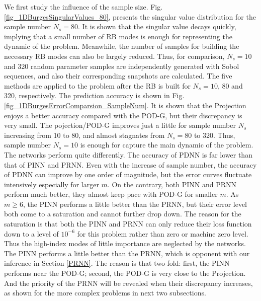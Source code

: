 \documentclass[preprint, 10pt]{elsarticle}
\begin{document}
We first study the influence of the sample size. Fig. \ref{fig_1DBurgesSingularValues_80}, presents the singular value distribution for the sample number $N_s=80$. It is shown that the singular value decays quickly, implying that  a small number of RB modes is enough for representing the dynamic of the problem. Meanwhile, the number of samples for building the necessary RB modes can also be largely reduced. Thus, for comparison, $N_{s}=10$ and 320 random parameter samples are independently generated with Sobol sequences, and also their corresponding snapshots are calculated. The five methods are applied to the problem after the RB is built for $N_{s}=10$, 80 and 320, respectively. The prediction accuracy is shown in Fig. \ref{fig_1DBurgesErrorComparsion_SampleNum}. It is shown that the Projection enjoys a better accuracy compared with the POD-G, but their discrepancy is very small. The pojection/POD-G improves just a little for sample number $N_s$ increasing from 10 to 80, and almost stagnates from $N_s=80$ to 320. Thus, sample number $N_s=10$ is enough for capture the main dynamic of the problem. The networks perform quite differently. The accuracy of PDNN is far lower than that of PINN and PRNN. Even with the increase of sample number, the accuracy of PDNN can improve by one order of magnitude, but the error curves fluctuate intensively especially for larger $m$. On the contrary, both PINN and PRNN perform much better, they almost keep pace with POD-G for smaller $m$. As $m \ge 6$, the PINN performs a little better than the PRNN, but their error level both come to a saturation and cannot further drop down. The reason for the saturation is that both the PINN and PRNN can only reduce their loss function down to a level of $10^{-6}$ for this problem rather than zero or machine zero level. Thus the high-index modes of little importance are neglected by the networks.  The PINN performs a little better than the PRNN, which is opponent with our inference in Section \ref{PRNN}. The reason is that two-fold: first, the PINN performs near the POD-G;  second, the POD-G is very close to the Projection. And the priority of the PRNN will be revealed when their discrepancy increases, as shown for the more complex problems in next two subsections.
\end{document}
